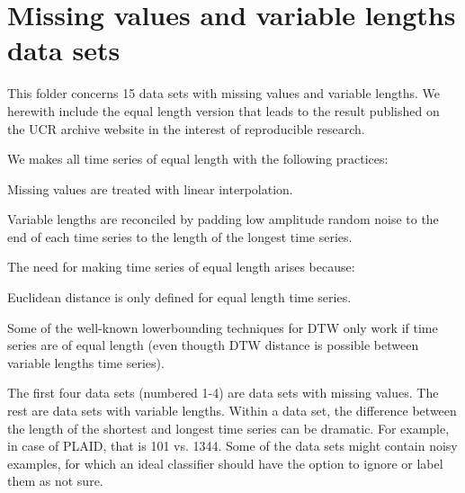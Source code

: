 \chapter{Missing values and variable lengths data sets}
\hypertarget{md_external_2data_2UCRArchive__2018_2Missing__value__and__variable__length__datasets__adjusted_2REAME}{}\label{md_external_2data_2UCRArchive__2018_2Missing__value__and__variable__length__datasets__adjusted_2REAME}
\label{md_external_2data_2UCRArchive__2018_2Missing__value__and__variable__length__datasets__adjusted_2REAME_autotoc_md148}%
%
 This folder concerns 15 data sets with missing values and variable lengths. We herewith include the equal length version that leads to the result published on the UCR archive website in the interest of reproducible research.

We makes all time series of equal length with the following practices\+:
\begin{DoxyItemize}
\item Missing values are treated with linear interpolation.
\item Variable lengths are reconciled by padding low amplitude random noise to the end of each time series to the length of the longest time series.
\end{DoxyItemize}

The need for making time series of equal length arises because\+:
\begin{DoxyItemize}
\item Euclidean distance is only defined for equal length time series.
\item Some of the well-\/known lowerbounding techniques for DTW only work if time series are of equal length (even thougth DTW distance is possible between variable lengths time series).
\end{DoxyItemize}

The first four data sets (numbered 1-\/4) are data sets with missing values. The rest are data sets with variable lengths. Within a data set, the difference between the length of the shortest and longest time series can be dramatic. For example, in case of PLAID, that is 101 vs. 1344. Some of the data sets might contain noisy examples, for which an ideal classifier should have the option to ignore or label them as \textquotesingle{}not sure\textquotesingle{}.


